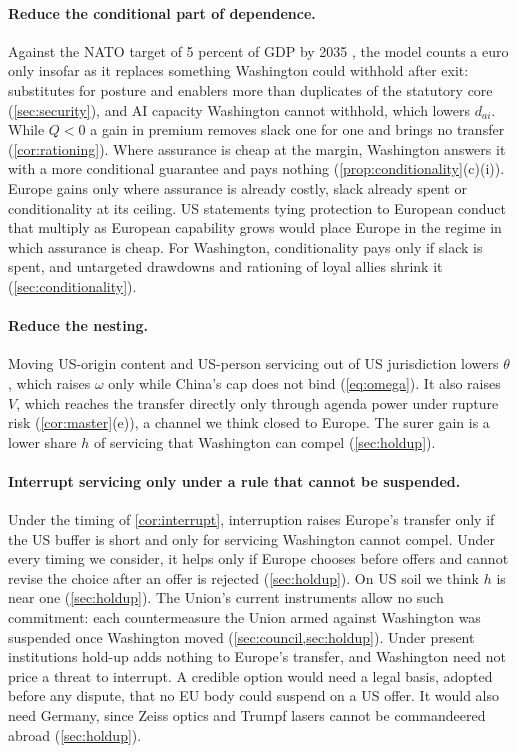 \paragraph{Reduce the conditional part of dependence.} Against the NATO target of 5 percent of GDP by 2035 \citep{nato2025hague}, the model counts a euro only insofar as it replaces something Washington could withhold after exit: substitutes for posture and enablers more than duplicates of the statutory core (\cref{sec:security}), and AI capacity Washington cannot withhold, which lowers $d_{ai}$. While $Q<0$ a gain in premium removes slack one for one and brings no transfer (\cref{cor:rationing}). Where assurance is cheap at the margin, Washington answers it with a more conditional guarantee and pays nothing (\cref{prop:conditionality}(c)(i)). Europe gains only where assurance is already costly, slack already spent or conditionality at its ceiling. US statements tying protection to European conduct that multiply as European capability grows would place Europe in the regime in which assurance is cheap. For Washington, conditionality pays only if slack is spent, and untargeted drawdowns and rationing of loyal allies shrink it (\cref{sec:conditionality}).

\paragraph{Reduce the nesting.} Moving US-origin content and US-person servicing out of US jurisdiction lowers $\theta$, which raises $\omega$ only while China's cap does not bind (\cref{eq:omega}). It also raises $V$, which reaches the transfer directly only through agenda power under rupture risk (\cref{cor:master}(e)), a channel we think closed to Europe. The surer gain is a lower share $h$ of servicing that Washington can compel (\cref{sec:holdup}).

\paragraph{Interrupt servicing only under a rule that cannot be suspended.} Under the timing of \cref{cor:interrupt}, interruption raises Europe's transfer only if the US buffer is short and only for servicing Washington cannot compel. Under every timing we consider, it helps only if Europe chooses before offers and cannot revise the choice after an offer is rejected (\cref{sec:holdup}). On US soil we think $h$ is near one (\cref{sec:holdup}). The Union's current instruments allow no such commitment: each countermeasure the Union armed against Washington was suspended once Washington moved (\cref{sec:council,sec:holdup}). Under present institutions hold-up adds nothing to Europe's transfer, and Washington need not price a threat to interrupt. A credible option would need a legal basis, adopted before any dispute, that no EU body could suspend on a US offer. It would also need Germany, since Zeiss optics and Trumpf lasers cannot be commandeered abroad (\cref{sec:holdup}).

